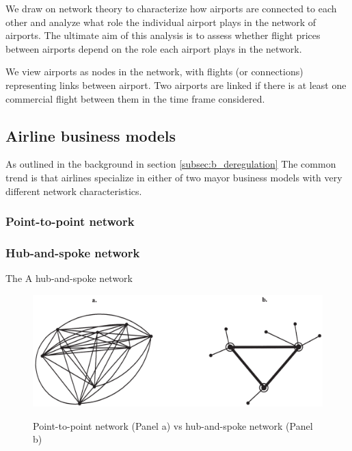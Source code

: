 \label{sec:theory}
We draw on network theory to characterize how airports are connected to each other and analyze what role the individual airport plays in the network of airports. The ultimate aim of this analysis is to assess whether flight prices between airports depend on the role each airport plays in the network.\par
We view airports as nodes in the network, with flights (or connections) representing links between airport. Two airports are linked if there is at least one commercial flight between them in the time frame considered.

\subsection{Airline business models}
As outlined in the background in section \ref{subsec:b_deregulation} The common trend is that airlines specialize in either of two mayor business models with very different network characteristics.

\subsubsection{Point-to-point network}


\subsubsection{Hub-and-spoke network}
The
A hub-and-spoke network




\begin{figure}[H]
  \centering
  \caption{Point-to-point network (Panel a) vs hub-and-spoke network (Panel b)}
    \includegraphics[width=1. \textwidth]{03_figures/Bryan_1999_networks}
  \label{fig:Bryan1999}
\end{figure}



